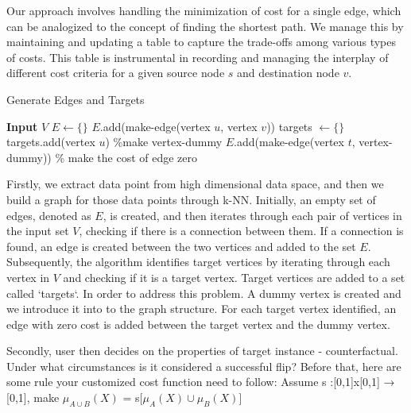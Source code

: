 Our approach involves handling the minimization of cost for a single edge, which can be analogized to the concept of finding the shortest path. We manage this by maintaining and updating a table to capture the trade-offs among various types of costs. This table is instrumental in recording and managing the interplay of different cost criteria for a given source node $s$ and destination node $v$.

\begin{algorithm}
\caption{Generate Edges and Targets}
\begin{algorithmic}[1]
    \State \textbf{Input} $V$
    \State $E \gets \{\}$
                \State $E$.add(make-edge(vertex $u$, vertex $v$))
            \EndIf
        \EndFor
    \EndFor
    \State targets $\gets \{\}$
            \State targets.add(vertex $u$)
        \EndIf
    \EndFor
    \State \%make vertex-dummy
        \State $E$.add(make-edge(vertex $t$, vertex-dummy))
        \State \% make the cost of edge zero
    \EndFor
\end{algorithmic}
\end{algorithm}

Firstly, we extract data point from high dimensional data space, and then we build a graph for those data points through k-NN. Initially, an empty set of edges, denoted as $E$, is created, and then iterates through each pair of vertices in the input set $V$, checking if there is a connection between them. If a connection is found, an edge is created between the two vertices and added to the set $E$. Subsequently, the algorithm identifies target vertices by iterating through each vertex in $V$ and checking if it is a target vertex. Target vertices are added to a set called `targets`. In order to address this problem. A dummy vertex is created and we introduce it into to the graph structure. For each target vertex identified, an edge with zero cost is added between the target vertex and the dummy vertex. 

Secondly, user then decides on the properties of target instance - counterfactual. Under what circumstances is it considered a successful flip? Before that, here are some rule your customized cost function need to follow:
Assume s :[0,1]x[0,1] → [0,1], make $\mu_{A \cup B}(X)$ = s[$\mu_A(X) \cup \mu_B(X)$]


